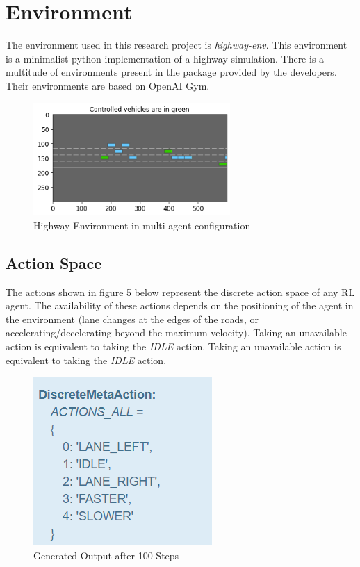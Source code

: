 \documentclass[conference]{IEEEtran}
\begin{document}
\section{Environment}
The environment used in this research project is \textit{highway-env}\cite{highway-env}. This environment is a minimalist python implementation of a highway simulation. There is a multitude of environments present in the package provided by the developers.
Their environments are based on OpenAI Gym\cite{brockman2016openai}.

\begin{figure}[hbt!]
\vspace*{0.1cm}
\centerline{\includegraphics[width=75mm]{images/highway-env.png}}
\caption{Highway Environment in multi-agent configuration}\label{fig1}
\end{figure}

\subsection{Action Space}
The actions shown in figure 5 below represent the discrete action space of any RL agent. The availability of these actions depends on the positioning of the agent in the environment
(lane changes at the edges of the roads, or accelerating/decelerating beyond the maximum velocity). Taking an unavailable action is equivalent to taking the \textit{IDLE} action.
Taking an unavailable action is equivalent to taking the \textit{IDLE} action.
\begin{figure}[hbt!]
\centerline{\includegraphics[width=0.3\linewidth]{images/action_space.png}}
\caption{Generated Output after 100 Steps}
\label{fig2}
\end{figure}
\end{document}
